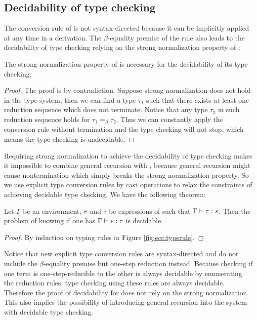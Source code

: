 \subsection{Decidability of type checking}
The conversion rule of \cc is not syntax-directed because it can be implicitly applied at any time in a derivation. The $\beta$-equality premise of the rule also leads to the decidability of type checking relying on the strong normalization property of \cc:

\begin{thm}
The strong normalization property of \cc is necessary for the decidability of its type checking.
\end{thm}

\begin{proof}
The proof is by contradiction. Suppose strong normalization does not hold in the type system, then we can find a type $\tau_{{\mathrm{1}}}$ such that there exists at least one reduction sequence which does not terminate. Notice that any type $\tau_{{\mathrm{2}}}$ in such reduction sequence holds for $ \tau_{{\mathrm{1}}}  =_{\beta}  \tau_{{\mathrm{2}}} $. Thus we can constantly apply the conversion rule without termination and the type checking will not stop, which means the type checking is undecidable.
\end{proof}

Requiring strong normalization to achieve the decidability of type checking makes it impossible to combine general recursion with \cc, because general recursion might cause nontermination which simply breaks the strong normalization property. So we use explicit type conversion rules by cast operations to relax the constraints of achieving decidable type checking. We have the following theorem:

\begin{thm}
Let $\Gamma$ be an environment, $\mathit{e}$ and $\tau$ be expressions of \expcc such that $\Gamma  \vdash  \tau  :  \mathit{s}$. Then the problem of knowing if one has $\Gamma  \vdash  \mathit{e}  :  \tau$ is decidable.
\end{thm}

\begin{proof}
By induction on typing rules in Figure \ref{fig:ecc:typerule}.
\end{proof}

Notice that new explicit type conversion rules are syntax-directed and do not include the $\beta$-equality premise but one-step reduction instead. Because checking if one term is one-step-reducible to the other is always decidable by enumerating the reduction rules, type checking using these rules are always decidable. Therefore the proof of decidability for \expcc does not rely on the strong normalization. This also implies the possibility of introducing general recursion into the system with decidable type checking.

